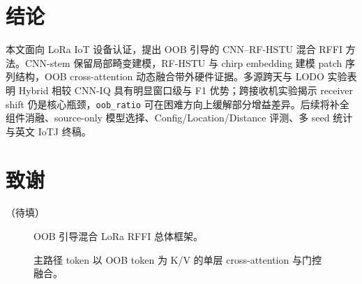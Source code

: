 \documentclass[journal]{IEEEtran}
\begin{document}
\section{结论}
本文面向 LoRa IoT 设备认证，提出 OOB 引导的 CNN--RF-HSTU 混合 RFFI 方法。CNN-stem 保留局部畸变建模，RF-HSTU 与 chirp embedding 建模 patch 序列结构，OOB cross-attention 动态融合带外硬件证据。多源跨天与 LODO 实验表明 Hybrid 相较 CNN-IQ 具有明显窗口级与 F1 优势；跨接收机实验揭示 receiver shift 仍是核心瓶颈，\texttt{oob\_ratio} 可在困难方向上缓解部分增益差异。后续将补全组件消融、source-only 模型选择、Config/Location/Distance 评测、多 seed 统计与英文 IoTJ 终稿。

\section*{致谢}
（待填）

\begin{figure}[!t]
\centering
{}
\caption{OOB 引导混合 LoRa RFFI 总体框架。}
\label{fig:framework}
\end{figure}

\begin{figure}[!t]
\centering
{}
\caption{主路径 token 以 OOB token 为 K/V 的单层 cross-attention 与门控融合。}
\label{fig:oob_attn}
\end{figure}
\end{document}
